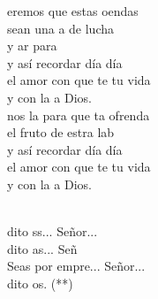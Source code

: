 \documentclass[12pt]{article}
\begin{document}
\begin{multicols*}{2}
\begin{cancion}%
	eremos que estas oendas \\
	sean una a de lucha \\
	y ar para \\
	y así recordar día día \\
	el amor con que te tu vida \\
	y con la a Dios.\\
\jump
	nos la  para que ta ofrenda \\
	 el fruto de estra lab\\
	y así recordar día día \\
	el amor con que te tu vida\\
	y con la a Dios.\\\jump\\
	\begin{chorus}%
	dito ss... Señor...\\
	dito as... Señ\\
	Seas por empre... Señor...\\
	dito os. (**)\\
	\end{chorus}%
	\jump\\
\end{cancion}%


\end{multicols*}
\end{document}
